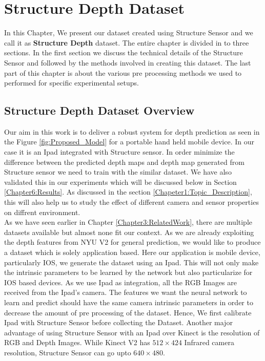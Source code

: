 

\chapter{Structure Depth Dataset}

\label{Chapter4:Dataset} 


In this Chapter, We present our dataset created using Structure Sensor and we call it as \textbf{Structure Depth} dataset. The entire chapter is divided in to three sections. In the first section we discuss the technical details of the Structure Sensor and followed by the methods involved in creating this dataset. The last part of this chapter is about the various pre processing methods we used to performed for specific experimental setups.


\section{Structure Depth Dataset Overview} 

Our aim in this work is to deliver a robust system for depth prediction as seen in the Figure \ref{fig:Proposed_Model} for a portable hand held mobile device. In our case it is an Ipad integrated with Structure sensor. In order minimize the difference between the predicted depth maps and depth map generated from Structure sensor we need to train with the similar dataset. We have also validated this in our experiments which will be discussed below in Section \ref{Chapter6:Results}. As discussed in the section \ref{Chapeter1:Topic_Description}, this will also help us to study the effect of different camera and sensor properties on diffrent environment.\\

As we have seen earlier in Chapter \ref{Chapter3:RelatedWork}, there are multiple datasets available but almost none fit our context. As we are already exploiting the depth features from NYU V2 for general prediction, we would like to produce a dataset which is solely application based. Here our application is mobile device, particularly IOS, we generate the dataset using an Ipad. This will not only make the intrinsic parameters to be learned by the network but also particularize for IOS based devices. As we use Ipad as integration, all the RGB Images are received from the Ipad's camera. The features we want the neural network to learn and predict should have the same camera intrinsic parameters in order to decrease the amount of pre processing of the dataset. Hence, We first calibrate Ipad with Structure Sensor before collecting the Dataset. Another major advantage of using Structure Sensor with an Ipad over Kinect is the resolution of RGB and Depth Images. While Kinect V2 has $512\times424$ Infrared camera resolution, Structure Sensor can go upto $640\times480$. \\

